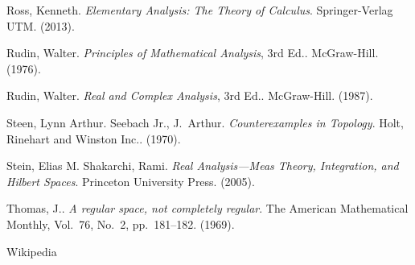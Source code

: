 \begin{thebibliography}{9}
Ross, Kenneth.  \textit{Elementary Analysis:  The Theory of Calculus}.  Springer-Verlag UTM.  (2013).

Rudin, Walter.  \textit{Principles of Mathematical Analysis}, 3rd Ed..  McGraw-Hill.  (1976).

Rudin, Walter.  \textit{Real and Complex Analysis}, 3rd Ed..  McGraw-Hill.  (1987).

Steen, Lynn Arthur.  Seebach Jr., J.~Arthur.  \textit{Counterexamples in Topology}.  Holt, Rinehart and Winston Inc..  (1970).

Stein, Elias M.  Shakarchi, Rami.  \textit{Real Analysis---Meas Theory, Integration, and Hilbert Spaces}.  Princeton University Press.  (2005).

Thomas, J..  \textit{A regular space, not completely regular}.  The American Mathematical Monthly, Vol.~76, No.~2, pp.~181--182.  (1969).

Wikipedia

\end{thebibliography}